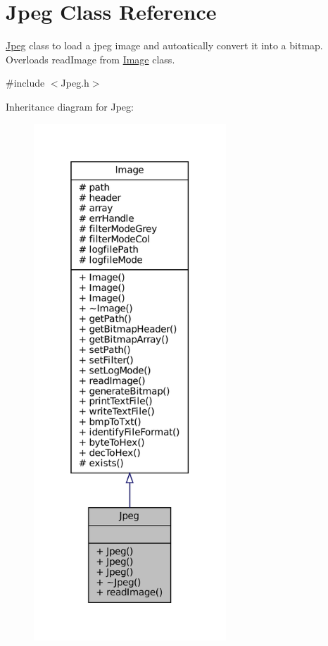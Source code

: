 \hypertarget{classJpeg}{}\section{Jpeg Class Reference}
\label{classJpeg}


\mbox{\hyperlink{classJpeg}{Jpeg}} class to load a jpeg image and autoatically convert it into a bitmap. Overloads read\+Image from \mbox{\hyperlink{classImage}{Image}} class.  




{\ttfamily \#include $<$Jpeg.\+h$>$}



Inheritance diagram for Jpeg\+:
\nopagebreak
\begin{figure}[H]
\begin{center}
\leavevmode
\includegraphics[height=550pt]{classJpeg__inherit__graph}
\end{center}
\end{figure}


